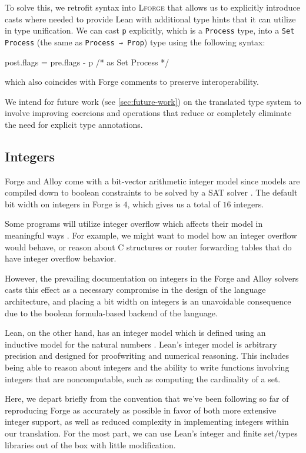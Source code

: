 To solve this, we retrofit syntax into \textsc{Lforge} that allows us to explicitly introduce casts where needed to provide Lean with additional type hints that it can utilize in type unification. We can cast \texttt{p} explicitly, which is a \texttt{Process} type, into a \texttt{Set Process} (the same as \texttt{Process → Prop}) type using the following syntax: 
\begin{forge*}
post.flags = pre.flags - p /* as Set Process */
\end{forge*}
which also coincides with Forge comments to preserve interoperability. 

We intend for future work (see \cref{sec:future-work}) on the translated type system to involve improving coercions and operations that reduce or completely eliminate the need for explicit type annotations. 

\subsection{Integers}\label{sec:integers}
Forge and Alloy come with a bit-vector arithmetic integer model since models are compiled down to boolean constraints to be solved by a SAT solver \cite{jackson2012software,nelson2024artifact}. The default bit width on integers in Forge is $4$, which gives us a total of $16$ integers. 

Some programs will utilize integer overflow which affects their model in meaningful ways \cite[22]{ngpdbccdlrrvwwk-oopsla-2024}. For example, we might want to model how an integer overflow would behave, or reason about C structures or router forwarding tables that do have integer overflow behavior. 

However, the prevailing documentation on integers in the Forge and Alloy solvers casts this effect as a necessary compromise in the design of the language architecture, and placing a bit width on integers is an unavoidable consequence due to the boolean formula-based backend of the language. 

Lean, on the other hand, has an integer model which is defined using an inductive model for the natural numbers \cite{avigad2024theorem}. Lean's integer model is arbitrary precision and designed for proofwriting and numerical reasoning. This includes being able to reason about integers and the ability to write functions involving integers that are noncomputable, such as computing the cardinality of a set. 

Here, we depart briefly from the convention that we've been following so far of reproducing Forge as accurately as possible in favor of both more extensive integer support, as well as reduced complexity in implementing integers within our translation. For the most part, we can use Lean's integer and finite set/types libraries out of the box with little modification. 

